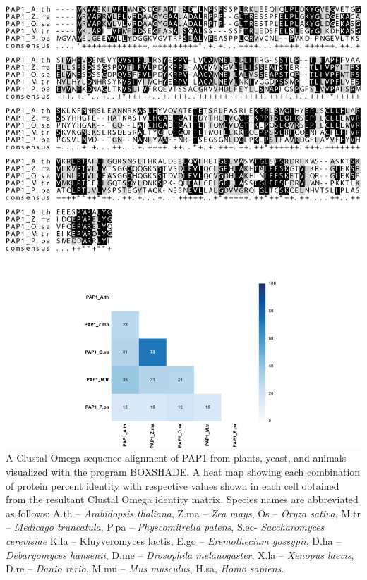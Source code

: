 \begin{FPfigure}
	\centering
	\includegraphics[width=\columnwidth]{Proteasome/pap1align1.png}
	{A Clustal Omega \citep{sievers14} sequence alignment of PAP1 from plants, yeast, and animals visualized with the program BOXSHADE. A heat map showing each combination of protein percent identity with respective values shown in each cell obtained from the resultant Clustal Omega identity matrix. Species names are abbreviated as follows: A.th – \textit{Arabidopsis thaliana}, Z.ma – \textit{Zea mays}, Os – \textit{Oryza sativa}, M.tr – \textit{Medicago truncatula}, P.pa – \textit{Physcomitrella patens}, S.ec- \textit{Saccharomyces cerevisiae} K.la – {Kluyveromyces lactis}, E.go – \textit{Eremothecium gossypii}, D.ha – \textit{Debaryomyces hansenii}, D.me – \textit{Drosophila melanogaster}, X.la – \textit{Xenopus laevis}, D.re – \textit{Danio rerio}, M.mu – \textit{Mus musculus}, H.sa, \textit{Homo sapiens}.}
	\label{fig:pap1align}
\end{FPfigure}

